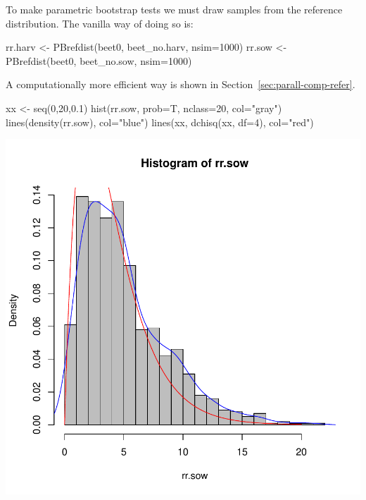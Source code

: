 \documentclass[12pt]{article}
\begin{document}
To make parametric bootstrap tests we must draw samples from the
reference distribution. The vanilla way of doing so is:

\begin{Schunk}
\begin{Sinput}
 rr.harv <- PBrefdist(beet0, beet_no.harv, nsim=1000)
 rr.sow  <- PBrefdist(beet0, beet_no.sow,  nsim=1000)
\end{Sinput}
\end{Schunk}

A computationally more efficient way is shown in Section~\ref{sec:parall-comp-refer}.


\begin{Schunk}
\begin{Sinput}
 xx <- seq(0,20,0.1)
 hist(rr.sow, prob=T, nclass=20, col="gray")
 lines(density(rr.sow), col="blue")
 lines(xx, dchisq(xx, df=4), col="red")
\end{Sinput}
\end{Schunk}
\includegraphics{figures/MMtest-011}
\end{document}
